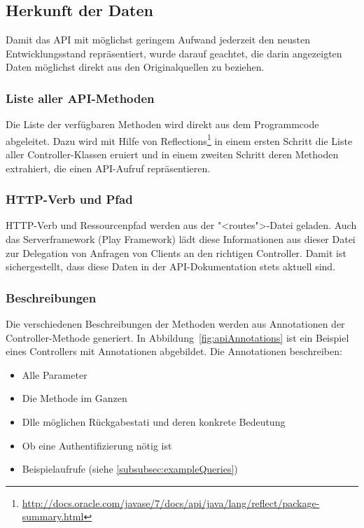 	\subsection{Herkunft der Daten}
		Damit das API mit möglichst geringem Aufwand jederzeit den neusten Entwicklungsstand repräsentiert, wurde darauf geachtet,
		die darin angezeigten Daten möglichst direkt aus den Originalquellen zu beziehen.
		
		
		\subsubsection{Liste aller API-Methoden}
			Die Liste der verfügbaren Methoden wird direkt aus dem Programmcode abgeleitet.
			Dazu wird mit Hilfe von Reflections\footnote{\url{http://docs.oracle.com/javase/7/docs/api/java/lang/reflect/package-summary.html}} in einem ersten Schritt die Liste aller Controller-Klassen eruiert
			und in einem zweiten Schritt deren Methoden extrahiert, die einen API-Aufruf repräsentieren.
		
		
		\subsubsection{HTTP-Verb und Pfad}
			HTTP-Verb und Ressourcenpfad werden aus der "<routes">-Datei geladen.
			Auch das Serverframework (Play Framework) lädt diese Informationen aus dieser Datei zur Delegation von Anfragen von Clients an den richtigen Controller.
			Damit ist sichergestellt, dass diese Daten in der API-Dokumentation stets aktuell sind.
			
			
		\subsubsection{Beschreibungen}
			Die verschiedenen Beschreibungen der Methoden werden aus Annotationen der Controller-Methode generiert.
			In Abbildung~\ref{fig:apiAnnotations} ist ein Beispiel eines Controllers mit Annotationen abgebildet.
			Die Annotationen beschreiben:
			\begin{itemize}
				\item{Alle Parameter}
				\item{Die Methode im Ganzen}
				\item{Dlle möglichen Rückgabestati und deren konkrete Bedeutung}
				\item{Ob eine Authentifizierung nötig ist}
				\item{Beispielaufrufe (siehe \ref{subsubsec:exampleQueries})}
			\end{itemize}
			
